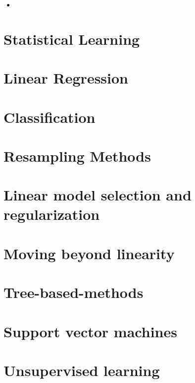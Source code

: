 \begin{itemize}
	\item
\end{itemize}
\section{Statistical Learning}

\section{Linear Regression}

\section{Classification}

\section{Resampling Methods}

\section{Linear model selection and regularization}

\section{Moving beyond linearity}

\section{Tree-based-methods}

\section{Support vector machines}

\section{Unsupervised learning}

